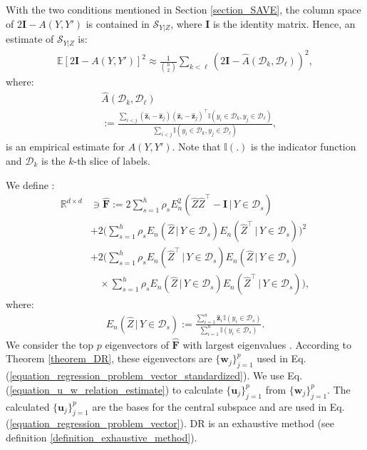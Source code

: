 \documentclass[lang=cn,10pt]{gorgeousnbook}
\numberwithin{equation}{section}%
\numberwithin{figure}{section}%
\begin{document}
\begin{theorem}[]\label{theorem_DR}
With the two conditions mentioned in Section \ref{section_SAVE}, the column space of $2 \boldsymbol{I} - A(Y, Y')$ is contained in $\mathcal{S}_{Y|Z}$, where $\boldsymbol{I}$ is the identity matrix. 
Hence, an estimate of $\mathcal{S}_{Y|Z}$ is:
\begin{align*}
\mathbb{E}[2 \boldsymbol{I} - A(Y, Y')]^2 \approx \frac{1}{\binom{h}{2}} \sum_{k < \ell} (2 \boldsymbol{I} - \widehat{A}(\mathcal{D}_k, \mathcal{D}_\ell))^2,
\end{align*}
where:
\begin{align*}
&\widehat{A}(\mathcal{D}_k, \mathcal{D}_\ell) \\
&:= \frac{\sum_{i<j} (\widehat{\boldsymbol{z}}_i - \widehat{\boldsymbol{z}}_j) (\widehat{\boldsymbol{z}}_i - \widehat{\boldsymbol{z}}_j)^\top \mathbb{I}(y_i \in \mathcal{D}_k, y_j \in \mathcal{D}_\ell)}{\sum_{i<j} \mathbb{I}(y_i \in \mathcal{D}_k, y_j \in \mathcal{D}_\ell)},
\end{align*}
is an empirical estimate for $A(Y, Y')$.
Note that $\mathbb{I}(.)$ is the indicator function and $\mathcal{D}_k$ is the $k$-th slice of labels. 
\end{theorem}

We define \cite{li2007directional}:
\begin{align*}
\mathbb{R}^{d \times d} &\ni \widehat{\boldsymbol{F}} := 2 \sum_{s=1}^h \rho_s E_n^2(\widehat{Z} \widehat{Z}^\top - \boldsymbol{I}\, |\, Y \in \mathcal{D}_s) \\
&+ 2 \Big(\sum_{s=1}^h \rho_s E_n(\widehat{Z}\, |\, Y \in \mathcal{D}_s) E_n(\widehat{Z}^\top\, |\, Y \in \mathcal{D}_s)\Big)^2 \\
&+ 2 \Big(\sum_{s=1}^h \rho_s E_n(\widehat{Z}^\top\, |\, Y \in \mathcal{D}_s) E_n(\widehat{Z}\, |\, Y \in \mathcal{D}_s) \\
&~~~~\times \sum_{s=1}^h \rho_s E_n(\widehat{Z}\, |\, Y \in \mathcal{D}_s) E_n(\widehat{Z}^\top\, |\, Y \in \mathcal{D}_s) \Big),
\end{align*}
where:
\begin{align*}
E_n(\widehat{Z}\, |\, Y \in \mathcal{D}_s) := \frac{\sum_{i=1}^n \widehat{\boldsymbol{z}}_i\, \mathbb{I}(y_i \in \mathcal{D}_s)}{\sum_{i=1}^n \mathbb{I}(y_i \in \mathcal{D}_s)}.
\end{align*}
We consider the top $p$ eigenvectors of $\widehat{\boldsymbol{F}}$ with largest eigenvalues \cite{ghojogh2019eigenvalue}.
According to Theorem \ref{theorem_DR}, these eigenvectors are $\{\boldsymbol{w}_j\}_{j=1}^p$ used in Eq. (\ref{equation_regression_problem_vector_standardized}). 
We use Eq. (\ref{equation_u_w_relation_estimate}) to calculate $\{\boldsymbol{u}_j\}_{j=1}^p$ from $\{\boldsymbol{w}_j\}_{j=1}^p$. The calculated $\{\boldsymbol{u}_j\}_{j=1}^p$ are the bases for the central subspace and are used in Eq. (\ref{equation_regression_problem_vector}). 
DR is an exhaustive method (see definition \ref{definition_exhaustive_method}).
\end{document}
